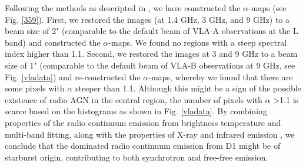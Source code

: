 \documentclass[]{aa} %
\begin{document}

 Following the methods as descripted in \cite{2015A&A...574A...4V}, we have constructed the $\alpha$-maps (see Fig. \ref{359}). First, we restored the images (at 1.4 GHz, 3 GHz, and 9 GHz) to a beam size of 2" (comparable to the default beam of VLA-A observations at the L band) and constructed the $\alpha$-maps.  We found no regions with a steep spectral index higher than 1.1. Second, we restored the images at 3 and 9 GHz to a beam size of 1" (comparable to the default beam of VLA-B observations at 9 GHz, see Fig. \ref{vladata}) and re-constructed the $\alpha$-maps, whereby we found that there are some pixels with $\alpha$ steeper than 1.1.  Although this might be a sign of the possible existence of radio AGN in the central region, the number of pixels with $\alpha$ >1.1 is scarce based on the histograms as shown in Fig. \ref{vladata}. By combining properties of the radio continuum emission from brightness temperature and multi-band fitting, along with the properties of X-ray and infrared emission \citep{2021MNRAS.506.5935R,2011A&A...529A.106I,2010AJ....140...63I}, we conclude that the dominated radio continuum emission from D1 might be of starburst origin, contributing to both synchrotron and free-free emission.

\end{document}
